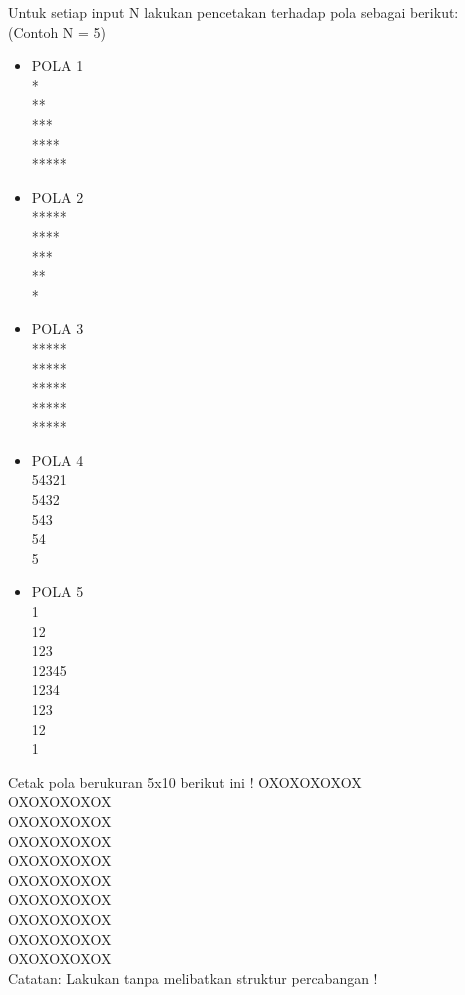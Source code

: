 \begin{pemrograman}
Untuk setiap input N lakukan pencetakan terhadap pola sebagai berikut: (Contoh N = 5)
\begin{itemize}
	\item POLA 1 \\
				* \\
				** \\
				*** \\
				**** \\
				***** \\
	\item POLA 2 \\
				***** \\
				**** \\
				*** \\
				** \\
				* \\
	\item POLA 3 \\
				***** \\
				***** \\
				***** \\
				***** \\
				***** \\
	\item POLA 4 \\
				54321 \\
				5432 \\
				543 \\
				54 \\
				5 \\
		\item POLA 5 \\
			1 \\
			12 \\
			123 \\
			12345 \\
			1234 \\
			123 \\
			12 \\
			1 \\
\end{itemize}
\end{pemrograman}

\begin{pemrograman}
Cetak pola berukuran 5x10 berikut ini !
OXOXOXOXOX\\
OXOXOXOXOX\\
OXOXOXOXOX\\
OXOXOXOXOX\\
OXOXOXOXOX\\
OXOXOXOXOX\\
OXOXOXOXOX\\
OXOXOXOXOX\\
OXOXOXOXOX\\
OXOXOXOXOX\\
Catatan: Lakukan tanpa melibatkan struktur percabangan !
\end{pemrograman}

